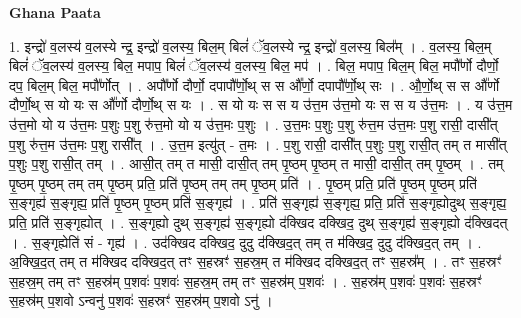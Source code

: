 \documentclass[17pt]{extarticle}
\begin{document}
\textbf{Ghana Paata } \newline

1. इन्द्रो॑ व॒लस्य॑ व॒लस्ये न्द्र॒ इन्द्रो॑ व॒लस्य॒ बिल॒म् बिलं॑ ॅव॒लस्ये न्द्र॒ इन्द्रो॑ व॒लस्य॒ बिल᳚म् । . व॒लस्य॒ बिल॒म् बिलं॑ ॅव॒लस्य॑ व॒लस्य॒ बिल॒ मपाप॒ बिलं॑ ॅव॒लस्य॑ व॒लस्य॒ बिल॒ मप॑ । . बिल॒ मपाप॒ बिल॒म् बिल॒ मपौ᳚र्णो दौर्णो॒ दप॒ बिल॒म् बिल॒ मपौ᳚र्णोत् । . अपौ᳚र्णो दौर्णो॒ दपापौ᳚र्णो॒थ् स स औ᳚र्णो॒ दपापौ᳚र्णो॒थ् सः । . औ॒र्णो॒थ् स स औ᳚र्णो दौर्णो॒थ् स यो यः स औ᳚र्णो दौर्णो॒थ् स यः । . स यो यः स स य उ॑त्त॒म उ॑त्त॒मो यः स स य उ॑त्त॒मः । . य उ॑त्त॒म उ॑त्त॒मो यो य उ॑त्त॒मः प॒शुः प॒शु रु॑त्त॒मो यो य उ॑त्त॒मः प॒शुः । . उ॒त्त॒मः प॒शुः प॒शु रु॑त्त॒म उ॑त्त॒मः प॒शु रासी॒ दासी᳚त् प॒शु रु॑त्त॒म उ॑त्त॒मः प॒शु रासी᳚त् । . उ॒त्त॒म इत्यु॑त् - त॒मः । . प॒शु रासी॒ दासी᳚त् प॒शुः प॒शु रासी॒त् तम् त मासी᳚त् प॒शुः प॒शु रासी॒त् तम् । . आसी॒त् तम् त मासी॒ दासी॒त् तम् पृ॒ष्ठम् पृ॒ष्ठम् त मासी॒ दासी॒त् तम् पृ॒ष्ठम् । . तम् पृ॒ष्ठम् पृ॒ष्ठम् तम् तम् पृ॒ष्ठम् प्रति॒ प्रति॑ पृ॒ष्ठम् तम् तम् पृ॒ष्ठम् प्रति॑ । . पृ॒ष्ठम् प्रति॒ प्रति॑ पृ॒ष्ठम् पृ॒ष्ठम् प्रति॑ स॒ङ्गृह्य॑ स॒ङ्गृह्य॒ प्रति॑ पृ॒ष्ठम् पृ॒ष्ठम् प्रति॑ स॒ङ्गृह्य॑ । . प्रति॑ स॒ङ्गृह्य॑ स॒ङ्गृह्य॒ प्रति॒ प्रति॑ स॒ङ्गृह्योदुथ् स॒ङ्गृह्य॒ प्रति॒ प्रति॑ स॒ङ्गृह्योत् । . स॒ङ्गृह्यो दुथ् स॒ङ्गृह्य॑ स॒ङ्गृह्यो द॑क्खिद दक्खिद॒ दुथ् स॒ङ्गृह्य॑ स॒ङ्गृह्यो द॑क्खिदत् । . स॒ङ्गृह्येति॑ सं - गृह्य॑ । . उद॑क्खिद दक्खिद॒ दुदु द॑क्खिद॒त् तम् त म॑क्खिद॒ दुदु द॑क्खिद॒त् तम् । . अ॒क्खि॒द॒त् तम् त म॑क्खिद दक्खिद॒त् तꣳ स॒हस्रꣳ॑ स॒हस्र॒म् त म॑क्खिद दक्खिद॒त् तꣳ स॒हस्र᳚म् । . तꣳ स॒हस्रꣳ॑ स॒हस्र॒म् तम् तꣳ स॒हस्र॑म् प॒शवः॑ प॒शवः॑ स॒हस्र॒म् तम् तꣳ स॒हस्र॑म् प॒शवः॑ । . स॒हस्र॑म् प॒शवः॑ प॒शवः॑ स॒हस्रꣳ॑ स॒हस्र॑म् प॒शवो ऽन्वनु॑ प॒शवः॑ स॒हस्रꣳ॑ स॒हस्र॑म् प॒शवो ऽनु॑ । \newline
\end{document}
